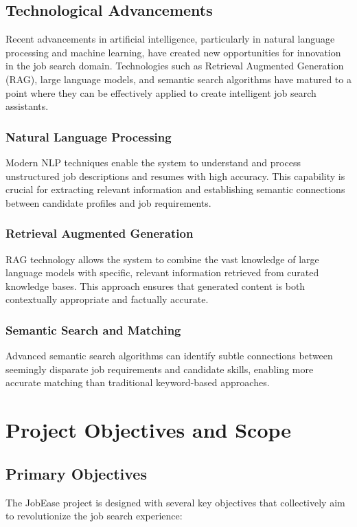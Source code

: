 \documentclass[12pt,a4paper]{report}
\begin{document}
\section{Technological Advancements}
Recent advancements in artificial intelligence, particularly in natural language processing and machine learning, have created new opportunities for innovation in the job search domain. Technologies such as Retrieval Augmented Generation (RAG), large language models, and semantic search algorithms have matured to a point where they can be effectively applied to create intelligent job search assistants.

\subsection{Natural Language Processing}
Modern NLP techniques enable the system to understand and process unstructured job descriptions and resumes with high accuracy. This capability is crucial for extracting relevant information and establishing semantic connections between candidate profiles and job requirements.

\subsection{Retrieval Augmented Generation}
RAG technology allows the system to combine the vast knowledge of large language models with specific, relevant information retrieved from curated knowledge bases. This approach ensures that generated content is both contextually appropriate and factually accurate.

\subsection{Semantic Search and Matching}
Advanced semantic search algorithms can identify subtle connections between seemingly disparate job requirements and candidate skills, enabling more accurate matching than traditional keyword-based approaches.

\chapter{Project Objectives and Scope}

\section{Primary Objectives}
The JobEase project is designed with several key objectives that collectively aim to revolutionize the job search experience:
\end{document}
